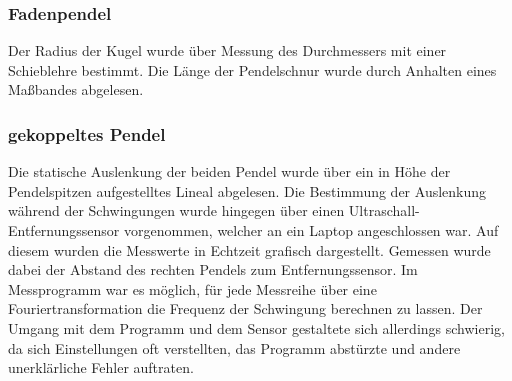 \subsubsection{Fadenpendel}
Der Radius der Kugel wurde über Messung des Durchmessers mit einer Schieblehre bestimmt. Die Länge der Pendelschnur wurde durch Anhalten eines Maßbandes abgelesen.
\subsubsection{gekoppeltes Pendel}
\label{messgekop zweiter änderung}
Die statische Auslenkung der beiden Pendel wurde über ein in Höhe der Pendelspitzen aufgestelltes Lineal abgelesen. Die Bestimmung der Auslenkung während der Schwingungen wurde hingegen über einen Ultraschall-Entfernungssensor vorgenommen, welcher an ein Laptop angeschlossen war. Auf diesem wurden die Messwerte in Echtzeit grafisch dargestellt. Gemessen wurde dabei der Abstand des rechten Pendels zum Entfernungssensor. Im Messprogramm war es möglich, für jede Messreihe über eine Fouriertransformation  die Frequenz der Schwingung berechnen zu lassen. Der Umgang mit dem Programm und dem Sensor gestaltete sich allerdings schwierig, da sich Einstellungen oft verstellten, das Programm abstürzte und andere unerklärliche Fehler auftraten.